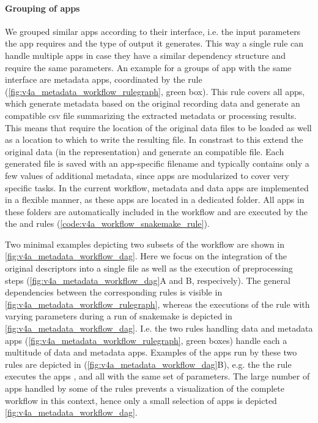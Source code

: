 \paragraph{Grouping of apps}
We grouped similar apps according to their interface, i.e. the input parameters the app requires and the type of output it generates. This way a single rule can handle multiple apps in case they have a similar dependency structure and require the same parameters. An example for a groups of app with the same interface are metadata apps, coordinated by the  rule (\cref{fig:v4a_metadata_workflow_rulegraph}, green box). This rule covers all apps, which generate metadata based on the original recording data and generate an  compatible csv file summarizing the extracted metadata or processing results. This means that require the location of the original data files to be loaded as well as a location to which to write the resulting  file. In constrast to this  extend the original data (in the  representation) and generate an  compatible  file. Each generated  file is saved with an app-specific filename and typically contains only a few values of additional metadata, since apps are modularized to cover very specific tasks.
In the current workflow, metadata and data apps are implemented in a flexible manner, as these apps are located in a dedicated folder. All apps in these folders are automatically included in the workflow and are executed by the the  and  rules (\cref{code:v4a_workflow_snakemake_rule}). 

Two minimal examples depicting two subsets of the workflow are shown in \cref{fig:v4a_metadata_workflow_dag}. Here we focus on the integration of the original  descriptors into a single  file as well as the execution of preprocessing steps (\cref{fig:v4a_metadata_workflow_dag}A and B, respecively). The general  dependencies between the corresponding rules is visible in \cref{fig:v4a_metadata_workflow_rulegraph}, whereas the executions of the rule with varying parameters during a run of snakemake is depicted in \cref{fig:v4a_metadata_workflow_dag}. I.e. the two rules handling data and metadata apps (\cref{fig:v4a_metadata_workflow_rulegraph}, green boxes) handle each a multitude of data and metadata apps. Examples of the apps run by these two rules are depicted in (\cref{fig:v4a_metadata_workflow_dag}B), e.g. the the  rule executes the apps ,  and  all with the same set of parameters. The large number of apps handled by some of the rules prevents a visualization of the complete workflow in this context, hence only a small selection of apps is depicted \cref{fig:v4a_metadata_workflow_dag}.

